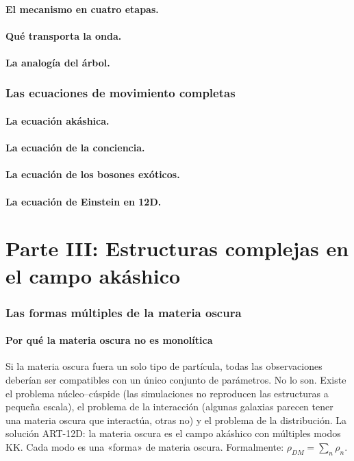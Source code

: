 \documentclass[11pt,a4paper]{article}
\begin{document}
\subsection{El mecanismo en cuatro etapas.}
\subsection{Qué transporta la onda.}
\subsection{La analogía del árbol.}

\section{Las ecuaciones de movimiento completas}
\subsection{La ecuación akáshica.}
\subsection{La ecuación de la conciencia.}
\subsection{La ecuación de los bosones exóticos.}
\subsection{La ecuación de Einstein en 12D.}

\newpage
\part*{Parte III: Estructuras complejas en el campo akáshico}

\section{Las formas múltiples de la materia oscura}
\subsection{Por qué la materia oscura no es monolítica}
Si la materia oscura fuera un solo tipo de partícula, todas las observaciones deberían ser compatibles con un único conjunto de parámetros. No lo son. Existe el problema núcleo--cúspide (las simulaciones no reproducen las estructuras a pequeña escala), el problema de la interacción (algunas galaxias parecen tener una materia oscura que interactúa, otras no) y el problema de la distribución. La solución ART-12D: la materia oscura es el campo akáshico con múltiples modos KK. Cada modo es una «forma» de materia oscura. Formalmente: $\rho_{DM} = \sum_n \rho_n$.
\end{document}
